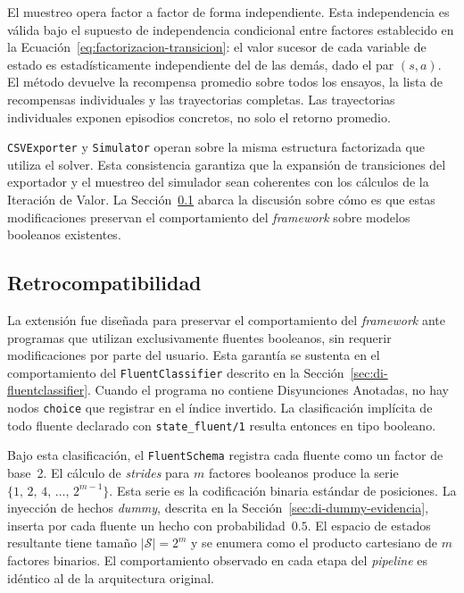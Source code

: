 El muestreo opera factor a factor de forma independiente. Esta independencia es
válida bajo el supuesto de independencia condicional entre factores establecido en
la Ecuación~\ref{eq:factorizacion-transicion}: el valor sucesor de cada variable de
estado es estadísticamente independiente del de las demás, dado el par $(s, a)$.
El método devuelve la recompensa promedio sobre todos los ensayos, la lista de
recompensas individuales y las trayectorias completas. Las trayectorias individuales exponen episodios concretos, no solo el retorno
promedio.

\texttt{CSVExporter} y \texttt{Simulator} operan sobre la misma estructura
factorizada que utiliza el solver. Esta consistencia garantiza que la expansión de
transiciones del exportador y el muestreo del simulador sean coherentes con los
cálculos de la Iteración de Valor. La Sección~\ref{sec:di-retrocompatibilidad}
abarca la discusión sobre cómo es que estas modificaciones preservan el comportamiento del
\textit{framework} sobre modelos booleanos existentes.

\clearpage

\subsection{Retrocompatibilidad}
\label{sec:di-retrocompatibilidad}

La extensión fue diseñada para preservar el comportamiento del \textit{framework}
ante programas que utilizan exclusivamente fluentes booleanos, sin requerir
modificaciones por parte del usuario. Esta garantía se sustenta en el comportamiento
del \texttt{FluentClassifier} descrito en la Sección~\ref{sec:di-fluentclassifier}.
Cuando el programa no contiene Disyunciones Anotadas, no hay nodos \texttt{choice}
que registrar en el índice invertido. La clasificación implícita de todo fluente
declarado con \texttt{state\_fluent/1} resulta entonces en tipo booleano.

Bajo esta clasificación, el \texttt{FluentSchema} registra cada fluente como un
factor de base~2. El cálculo de \textit{strides} para $m$ factores booleanos produce
la serie $\{1,\, 2,\, 4,\, \ldots,\, 2^{m-1}\}$. Esta serie es la codificación
binaria estándar de posiciones. La inyección de hechos \textit{dummy}, descrita en
la Sección~\ref{sec:di-dummy-evidencia}, inserta por cada fluente un hecho con
probabilidad~$0.5$. El espacio de estados resultante tiene tamaño $|\mathcal{S}| =
2^m$ y se enumera como el producto cartesiano de $m$ factores binarios. El
comportamiento observado en cada etapa del \textit{pipeline} es idéntico al de la
arquitectura original.

